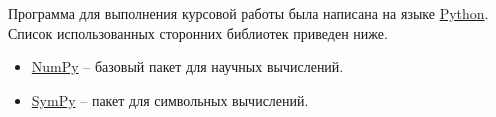 Программа для выполнения курсовой работы была написана на языке \href{https://www.python.org/}{Python}.
Список использованных сторонних библиотек приведен ниже.
\begin{itemize}
    \item \href{https://numpy.org/}{NumPy} -- базовый пакет для научных вычислений.
    \item \href{https://numpy.org/}{SymPy} -- пакет для символьных вычислений.
\end{itemize}